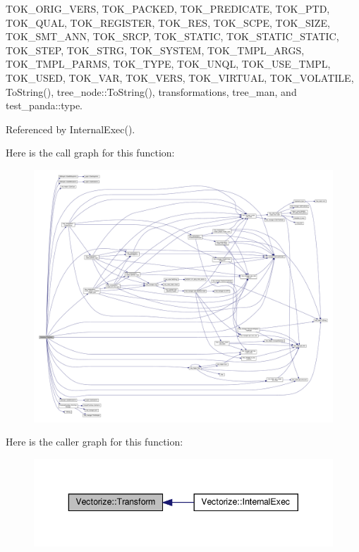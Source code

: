 T\+O\+K\+\_\+\+O\+R\+I\+G\+\_\+\+V\+E\+RS, T\+O\+K\+\_\+\+P\+A\+C\+K\+ED, T\+O\+K\+\_\+\+P\+R\+E\+D\+I\+C\+A\+TE, T\+O\+K\+\_\+\+P\+TD, T\+O\+K\+\_\+\+Q\+U\+AL, T\+O\+K\+\_\+\+R\+E\+G\+I\+S\+T\+ER, T\+O\+K\+\_\+\+R\+ES, T\+O\+K\+\_\+\+S\+C\+PE, T\+O\+K\+\_\+\+S\+I\+ZE, T\+O\+K\+\_\+\+S\+M\+T\+\_\+\+A\+NN, T\+O\+K\+\_\+\+S\+R\+CP, T\+O\+K\+\_\+\+S\+T\+A\+T\+IC, T\+O\+K\+\_\+\+S\+T\+A\+T\+I\+C\+\_\+\+S\+T\+A\+T\+IC, T\+O\+K\+\_\+\+S\+T\+EP, T\+O\+K\+\_\+\+S\+T\+RG, T\+O\+K\+\_\+\+S\+Y\+S\+T\+EM, T\+O\+K\+\_\+\+T\+M\+P\+L\+\_\+\+A\+R\+GS, T\+O\+K\+\_\+\+T\+M\+P\+L\+\_\+\+P\+A\+R\+MS, T\+O\+K\+\_\+\+T\+Y\+PE, T\+O\+K\+\_\+\+U\+N\+QL, T\+O\+K\+\_\+\+U\+S\+E\+\_\+\+T\+M\+PL, T\+O\+K\+\_\+\+U\+S\+ED, T\+O\+K\+\_\+\+V\+AR, T\+O\+K\+\_\+\+V\+E\+RS, T\+O\+K\+\_\+\+V\+I\+R\+T\+U\+AL, T\+O\+K\+\_\+\+V\+O\+L\+A\+T\+I\+LE, To\+String(), tree\+\_\+node\+::\+To\+String(), transformations, tree\+\_\+man, and test\+\_\+panda\+::type.



Referenced by Internal\+Exec().

Here is the call graph for this function\+:
\nopagebreak
\begin{figure}[H]
\begin{center}
\leavevmode
\includegraphics[width=350pt]{d5/da5/classVectorize_a9be0e93006fb6ab2ec0b36616b374069_cgraph}
\end{center}
\end{figure}
Here is the caller graph for this function\+:
\nopagebreak
\begin{figure}[H]
\begin{center}
\leavevmode
\includegraphics[width=343pt]{d5/da5/classVectorize_a9be0e93006fb6ab2ec0b36616b374069_icgraph}
\end{center}
\end{figure}


